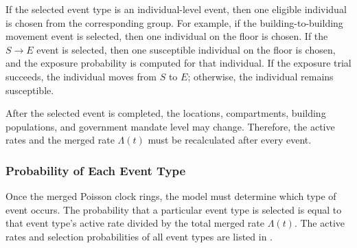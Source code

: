 \documentclass[11pt]{article}
\theoremstyle{definition}
\theoremstyle{plain}
\begin{document}
If the selected event type is an individual-level event, then one eligible individual is chosen from the corresponding group. For example, if the building-to-building movement event is selected, then one individual on the floor is chosen. If the $S\to E$ event is selected, then one susceptible individual on the floor is chosen, and the exposure probability is computed for that individual. If the exposure trial succeeds, the individual moves from $S$ to $E$; otherwise, the individual remains susceptible.

After the selected event is completed, the locations, compartments, building populations, and government mandate level may change. Therefore, the active rates and the merged rate $\Lambda(t)$ must be recalculated after every event.

\subsubsection{Probability of Each Event Type}

Once the merged Poisson clock rings, the model must determine which type of event occurs.
The probability that a particular event type is selected is equal to that event type's active
rate divided by the total merged rate $\Lambda(t)$. The active rates and selection probabilities of all event types are listed in .
\end{document}
